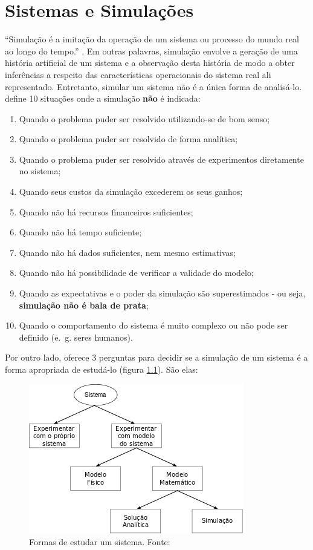 \chapter{\label{chap:simulation}Sistemas e Simulações}

``Simulação é a imitação da operação de um sistema ou processo do mundo real ao longo do tempo.'' \cite{Banks}. Em outras palavras, simulação envolve a geração de uma história artificial de um sistema e a observação desta história de modo a obter inferências a respeito das características operacionais do sistema real ali representado. Entretanto, simular um sistema não é a única forma de analisá-lo. \cite{BanksGibson} define 10 situações onde a simulação \textbf{não} é indicada:

\begin{enumerate}
\item Quando o problema puder ser resolvido utilizando-se de bom senso;
\item Quando o problema puder ser resolvido de forma analítica;
\item Quando o problema puder ser resolvido através de experimentos diretamente no sistema;
\item Quando seus custos da simulação excederem os seus ganhos;
\item Quando não há recursos financeiros suficientes;
\item Quando não há tempo suficiente;
\item Quando não há dados suficientes, nem mesmo estimativas;
\item Quando não há possibilidade de verificar a validade do modelo;
\item Quando as expectativas e o poder da simulação são superestimados - ou seja, \textbf{simulação não é bala de prata};
\item Quando o comportamento do sistema é muito complexo ou não pode ser definido (e.~g. seres humanos).
\end{enumerate}

Por outro lado, \cite{Law} oferece 3 perguntas para decidir se a simulação de um sistema é a forma apropriada de estudá-lo (figura \ref{fig:systemstudy}). São elas:

\begin{figure}[htb!]
\centering\includegraphics{img/systemstudy.png}
\caption{\label{fig:systemstudy}Formas de estudar um sistema. Fonte:~\cite{Law}}
\end{figure}

